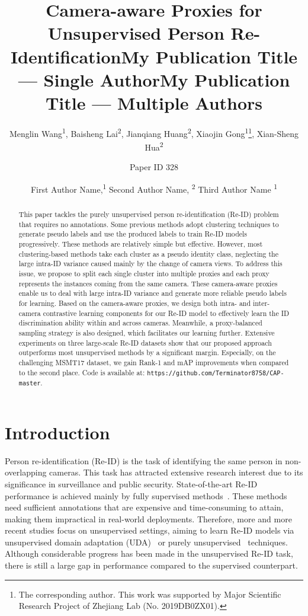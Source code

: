 \documentclass[letterpaper]{article} \usepackage{aaai21}  \usepackage{times}  \usepackage{helvet} \usepackage{courier}  \usepackage[hyphens]{url}  \usepackage{graphicx} \usepackage{subcaption}
\title{Camera-aware Proxies for Unsupervised Person Re-Identification}
\author {
    Menglin Wang\textsuperscript{\rm 1}, Baisheng Lai\textsuperscript{\rm 2}, Jianqiang Huang\textsuperscript{\rm 2}, 
    Xiaojin Gong\textsuperscript{\rm 1}\thanks{The corresponding author. This work was supported by Major Scientific Research Project of Zhejiang Lab (No. 2019DB0ZX01).}, Xian-Sheng Hua\textsuperscript{\rm 2}
    \\
}
\title{My Publication Title --- Single Author}
\author {
    Paper ID 328
}
\title{My Publication Title --- Multiple Authors}
\author {


        First Author Name,\textsuperscript{\rm 1}
        Second Author Name, \textsuperscript{\rm 2}
        Third Author Name \textsuperscript{\rm 1} \\
}
\begin{document}
\maketitle

\begin{abstract}
This paper tackles the purely unsupervised person re-identification (Re-ID) problem that requires no annotations. Some previous methods adopt clustering techniques to generate pseudo labels and use the produced labels to train Re-ID models progressively. These methods are relatively simple but effective. However, most clustering-based methods take each cluster as a pseudo identity class, neglecting the large intra-ID variance caused mainly by the change of camera views. To address this issue, we propose to split each single cluster into multiple proxies and each proxy represents the instances coming from the same camera. These camera-aware proxies enable us to deal with large intra-ID variance and generate more reliable pseudo labels for learning. Based on the camera-aware proxies, we design both intra- and inter-camera contrastive learning components for our Re-ID model to effectively learn the ID discrimination ability within and across cameras. Meanwhile, a proxy-balanced sampling strategy is also designed, which facilitates our learning further. Extensive experiments on three large-scale Re-ID datasets show that our proposed approach outperforms most unsupervised methods by a significant margin. Especially, on the challenging MSMT17 dataset, we gain  Rank-1 and  mAP improvements when compared to the second place. 
Code is available at: \texttt{https://github.com/Terminator8758/CAP-master}. 
\end{abstract}




\section{Introduction}
Person re-identification (Re-ID) is the task of identifying the same person in non-overlapping cameras. This task has attracted extensive research interest due to its significance in surveillance and public security. State-of-the-art Re-ID performance is achieved mainly by fully supervised methods~\cite{sun2018beyond, chen2019abd}. These methods need sufficient annotations that are expensive and time-consuming to attain, making them impractical in real-world deployments. Therefore, more and more recent studies focus on unsupervised settings, aiming to learn Re-ID models via unsupervised domain adaptation (UDA)~\cite{Wei2018PTGAN,qi2019DA,zhong2019invariance} or purely unsupervised~\cite{lin2019aBottom,li2018unsupervised,wu2019graph} techniques. Although considerable progress has been made in the unsupervised Re-ID task, there is still a large gap in performance compared to the supervised counterpart.
 
\end{document}
